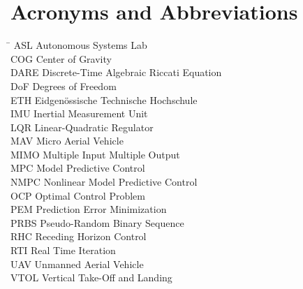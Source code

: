 \section*{Acronyms and Abbreviations}
\begin{tabbing}
 \hspace*{1.6cm}  \= \kill
 ASL \> Autonomous Systems Lab \\[0.5ex]
 COG \> Center of Gravity \\[0.5ex]
 DARE \> Discrete-Time Algebraic Riccati Equation \\[0.5ex]
 DoF \> Degrees of Freedom \\[0.5ex]
 ETH \> Eidgenössische Technische Hochschule \\[0.5ex]
 IMU \> Inertial Measurement Unit \\[0.5ex]
 LQR \> Linear-Quadratic Regulator \\[0.5ex]
 MAV \> Micro Aerial Vehicle \\[0.5ex]
 MIMO \> Multiple Input Multiple Output \\[0.5ex]
 MPC \> Model Predictive Control \\[0.5ex]
 NMPC \> Nonlinear Model Predictive Control \\[0.5ex]
 OCP \> Optimal Control Problem \\[0.5ex]
 PEM \> Prediction Error Minimization \\[0.5ex]
 PRBS \> Pseudo-Random Binary Sequence \\[0.5ex]
 RHC \> Receding Horizon Control \\[0.5ex]
 RTI \> Real Time Iteration \\[0.5ex]
 UAV \> Unmanned Aerial Vehicle \\[0.5ex]
 VTOL \> Vertical Take-Off and Landing \\[0.5ex]

\end{tabbing}
